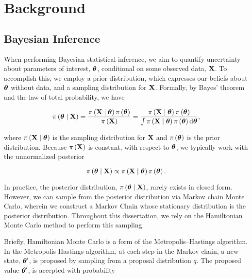\chapter{Background}
\label{ch:background}
\section{Bayesian Inference}
\label{ch_2:sec:bayesian-mcmc}

When performing Bayesian statistical inference, we aim to quantify uncertainty about parameters of interest, \( \boldsymbol{\theta} \), conditional on some observed data, \( \mathbf{X} \).
To accomplish this, we employ a prior distribution, which expresses our beliefs about \( \boldsymbol{\theta} \) without data, and a sampling distribution for \( \mathbf{X} \).
Formally, by Bayes' theorem and the law of total probability, we have 

\begin{equation}
    \pi \left( \boldsymbol{\theta} \mid \mathbf{X} \right) = \frac{\pi \left( \mathbf{X} \mid \boldsymbol{\theta} \right) \pi \left( \boldsymbol{\theta} \right)}{\pi \left(  \mathbf{X} \right)} = \frac{\pi \left( \mathbf{X} \mid \boldsymbol{\theta} \right) \pi \left( \boldsymbol{\theta} \right)}{\int \pi \left( \mathbf{X} \mid \boldsymbol{\theta} \right) \pi \left( \boldsymbol{\theta} \right) \mathrm{d} \boldsymbol{\theta}},
\end{equation}

where \( \pi \left( \mathbf{X} \mid \boldsymbol{\theta} \right) \) is the sampling distribution for \( \mathbf{X} \) and \( \pi \left( \boldsymbol{\theta} \right) \) is the prior distribution.
Because \( \pi \left( \mathbf{X} \right) \) is constant, with respect to \( \boldsymbol{\theta} \), we typically work with the unnormalized posterior

\begin{equation}
    \pi \left( \boldsymbol{\theta} \mid \mathbf{X} \right) \propto \pi \left( \mathbf{X} \mid \boldsymbol{\theta} \right) \pi \left( \boldsymbol{\theta} \right).
\end{equation}

In practice, the posterior distribution, \( \pi \left( \boldsymbol{\theta} \mid \mathbf{X} \right) \), rarely exists in closed form.
However, we can sample from the posterior distribution via Markov chain Monte Carlo, wherein we construct a Markov Chain whose stationary distribution is the posterior distribution.
Throughout this dissertation, we rely on the Hamiltonian Monte Carlo method to perform this sampling.

Briefly, Hamiltonian Monte Carlo is a form of the Metropolis–Hastings algorithm.
In the Metropolis-Hastings algorithm, at each step in the Markov chain, a new state, \( \boldsymbol{\theta}^\prime \), is proposed by sampling from a proposal distribution \( q \).
The proposed value \( \boldsymbol{\theta}^\prime \), is accepted with probability 

